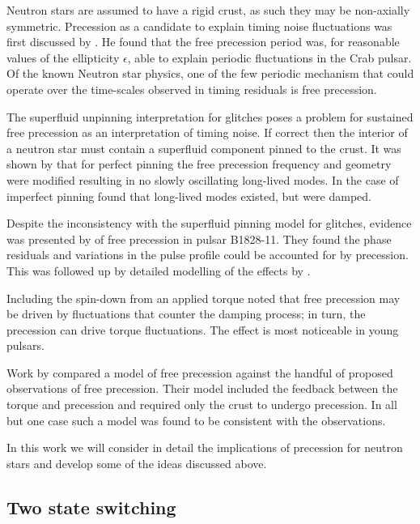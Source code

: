 Neutron stars are assumed to have a rigid crust, as such they may be
non-axially symmetric. Precession as a candidate to explain timing noise
fluctuations was first discussed by \citet{Ruderman1970}. He found that the
free precession period was, for reasonable values of the  ellipticity
$\epsilon$, able to explain periodic fluctuations in the Crab pulsar. Of the
known Neutron star physics, one of the few periodic mechanism that could
operate over the time-scales observed in timing residuals is free precession.

The superfluid unpinning interpretation for glitches poses a problem for
sustained free precession as an interpretation of timing noise. If correct then
the interior of a neutron star must contain a superfluid component pinned to
the crust.
It was shown by \citet{Shaham1977} that for perfect pinning the free precession
frequency and geometry were modified resulting in no slowly oscillating
long-lived modes. In the case of imperfect pinning \citet{Sedrakian1999} found
that long-lived modes existed, but were damped.

Despite the inconsistency with the superfluid pinning model for glitches,
evidence was presented by \citet{Stairs2000} of free precession in pulsar
B1828-11. They found the phase residuals and variations in the pulse profile
could be accounted for by precession. This was followed up by detailed
modelling of the effects by \citet{Akgun2006}.

Including the spin-down from an applied torque \citet{Cordes1993} noted that
free precession may be driven by fluctuations that counter the damping process;
in turn, the precession can drive torque fluctuations. The effect is most
noticeable in young pulsars.

Work by \citet{Jones2001} compared a model of free precession against the handful
of proposed observations of free precession. Their model included the feedback
between the torque and precession and required only the crust to undergo precession.
In all but one case such a model was found to be consistent with the observations.

In this work we will consider in detail the implications of precession for
neutron stars and develop some of the ideas discussed above.

\subsection{Two state switching}
\label{sec: two state switching}

